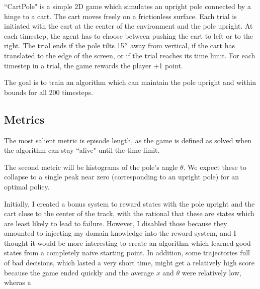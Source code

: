 \documentclass[12pt,a4paper]{article}
\begin{document}
``CartPole" is a simple 2D game which simulates an upright pole connected by a hinge to a cart.\cite{cartpole} The cart moves freely on a frictionless surface. Each trial is initiated with the cart at the center of the environment and the pole upright. At each timestep, the agent has to choose between pushing the cart to left or to the right. The trial ends if the pole tilts 15$\degree$ away from vertical, if the cart has translated to the edge of the screen, or if the trial reaches its time limit. For each timestep in a trial, the game rewards the player +1 point.

The goal is to train an algorithm which can maintain the pole upright and within bounds for all 200 timesteps.

\subsection*{Metrics}

The most salient metric is episode length, as the game is defined as solved when the algorithm can stay ``alive" until the time limit.

The second metric will be histograms of the pole's angle $\theta$. We expect these to collapse to a single peak near zero (corresponding to an upright pole) for an optimal policy.

Initially, I created a bonus system to reward states with the pole upright and the cart close to the center of the track, with the rational that these are states which are least likely to lead to failure. However, I disabled those because they amounted to injecting my domain knowledge into the reward system, and I thought it would be more interesting to create an algorithm which learned good states from a completely naive starting point. In addition, some trajectories full of bad decisions, which lasted a very short time, might get a relatively high score because the game ended quickly and the average $x$ and $\theta$ were relatively low, wheras a 
\end{document}
